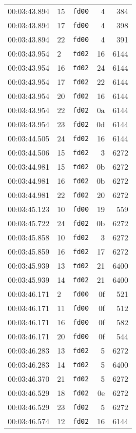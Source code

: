 \documentclass{article}
\begin{document}
\begin{longtable}{lllrr}
00:03:43.894 & 15 & \texttt{fd00} & 4 & 384 \\
00:03:43.894 & 17 & \texttt{fd00} & 4 & 398 \\
00:03:43.894 & 22 & \texttt{fd00} & 4 & 391 \\
00:03:43.954 & 2 & \texttt{fd02} & 16 & 6144 \\
00:03:43.954 & 16 & \texttt{fd02} & 24 & 6144 \\
00:03:43.954 & 17 & \texttt{fd02} & 22 & 6144 \\
00:03:43.954 & 20 & \texttt{fd02} & 16 & 6144 \\
00:03:43.954 & 22 & \texttt{fd02} & 0a & 6144 \\
00:03:43.954 & 23 & \texttt{fd02} & 0d & 6144 \\
00:03:44.505 & 24 & \texttt{fd02} & 16 & 6144 \\
00:03:44.506 & 15 & \texttt{fd02} & 3 & 6272 \\
00:03:44.981 & 15 & \texttt{fd02} & 0b & 6272 \\
00:03:44.981 & 16 & \texttt{fd02} & 0b & 6272 \\
00:03:44.981 & 22 & \texttt{fd02} & 20 & 6272 \\
00:03:45.123 & 10 & \texttt{fd00} & 19 & 559 \\
00:03:45.722 & 24 & \texttt{fd02} & 0b & 6272 \\
00:03:45.858 & 10 & \texttt{fd02} & 3 & 6272 \\
00:03:45.859 & 16 & \texttt{fd02} & 17 & 6272 \\
00:03:45.939 & 13 & \texttt{fd02} & 21 & 6400 \\
00:03:45.939 & 14 & \texttt{fd02} & 21 & 6400 \\
00:03:46.171 & 2 & \texttt{fd00} & 0f & 521 \\
00:03:46.171 & 11 & \texttt{fd00} & 0f & 512 \\
00:03:46.171 & 16 & \texttt{fd00} & 0f & 582 \\
00:03:46.171 & 20 & \texttt{fd00} & 0f & 544 \\
00:03:46.283 & 13 & \texttt{fd02} & 5 & 6272 \\
00:03:46.283 & 14 & \texttt{fd02} & 5 & 6400 \\
00:03:46.370 & 21 & \texttt{fd02} & 5 & 6272 \\
00:03:46.529 & 18 & \texttt{fd02} & 0e & 6272 \\
00:03:46.529 & 23 & \texttt{fd02} & 5 & 6272 \\
00:03:46.574 & 12 & \texttt{fd02} & 16 & 6144 \\

\end{longtable}
\end{document}
